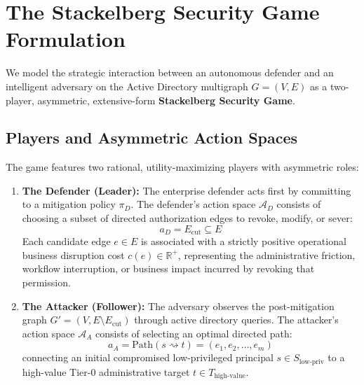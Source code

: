 \section{The Stackelberg Security Game Formulation}
We model the strategic interaction between an autonomous defender and an intelligent adversary on the Active Directory multigraph $G = (V, E)$ as a two-player, asymmetric, extensive-form \textbf{Stackelberg Security Game}.

\subsection{Players and Asymmetric Action Spaces}
The game features two rational, utility-maximizing players with asymmetric roles:
\begin{enumerate}
    \item \textbf{The Defender (Leader):} The enterprise defender acts first by committing to a mitigation policy $\pi_D$. The defender's action space $\mathcal{A}_D$ consists of choosing a subset of directed authorization edges to revoke, modify, or sever:
    \begin{equation}
    a_D = E_{\text{cut}} \subseteq E
    \end{equation}
    Each candidate edge $e \in E$ is associated with a strictly positive operational business disruption cost $c(e) \in \mathbb{R}^+$, representing the administrative friction, workflow interruption, or business impact incurred by revoking that permission.
    
    \item \textbf{The Attacker (Follower):} The adversary observes the post-mitigation graph $G' = (V, E \setminus E_{\text{cut}})$ through active directory queries. The attacker's action space $\mathcal{A}_A$ consists of selecting an optimal directed path:
    \begin{equation}
    a_A = \text{Path}(s \rightsquigarrow t) = (e_1, e_2, \dots, e_m)
    \end{equation}
    connecting an initial compromised low-privileged principal $s \in S_{\text{low-priv}}$ to a high-value Tier-0 administrative target $t \in T_{\text{high-value}}$.
\end{enumerate}

